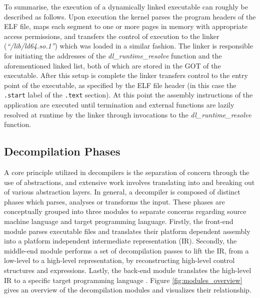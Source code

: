 To summarise, the execution of a dynamically linked executable can roughly be described as follows. Upon execution the kernel parses the program headers of the ELF file, maps each segment to one or more pages in memory with appropriate access permissions, and transfers the control of execution to the linker (\textit{``/lib/ld64.so.1''}) which was loaded in a similar fashion. The linker is responsible for initiating the addresses of the \textit{dl\_runtime\_resolve} function and the aforementioned linked list, both of which are stored in the GOT of the executable. After this setup is complete the linker transfers control to the entry point of the executable, as specified by the ELF file header (in this case the \texttt{.start} label of the \texttt{.text} section). At this point the assembly instructions of the application are executed until termination and external functions are lazily resolved at runtime by the linker through invocations to the \textit{dl\_runtime\_resolve} function.


\subsection{Decompilation Phases}
\label{sec:decompilation_phases}

A core principle utilized in decompilers is the separation of concern through the use of abstractions, and extensive work involves translating into and breaking out of various abstraction layers. In general, a decompiler is composed of distinct phases which parses, analyses or transforms the input. These phases are conceptually grouped into three modules to separate concerns regarding source machine language and target programming language. Firstly, the front-end module parses executable files and translates their platform dependent assembly into a platform independent intermediate representation (IR). Secondly, the middle-end module performs a set of decompilation passes to lift the IR, from a low-level to a high-level representation, by reconstructing high-level control structures and expressions. Lastly, the back-end module translates the high-level IR to a specific target programming language \cite{rev_comp}. Figure \ref{fig:modules_overview} gives an overview of the decompilation modules and visualizes their relationship.

